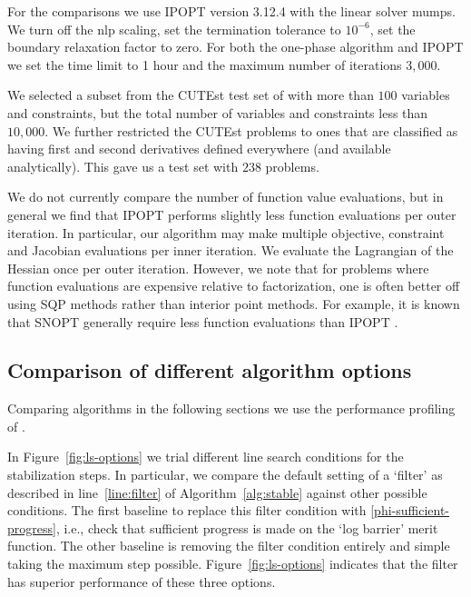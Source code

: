 \documentclass{article}
\begin{document}
For the comparisons we use IPOPT version 3.12.4 with the linear solver mumps. We turn off the nlp scaling, set the termination tolerance to $10^{-6}$, set the boundary relaxation factor to zero. For both the one-phase algorithm and IPOPT we set the time limit to 1 hour and the maximum number of iterations $3,000$.

We selected a subset from the CUTEst test set of with more than $100$ variables and constraints, but the total number of variables and constraints less than $10,000$. We further restricted the CUTEst problems to ones that are classified as having first and second derivatives defined everywhere (and available analytically). This gave us a test set with $238$ problems.

We do not currently compare the number of function value evaluations, but in general we find that IPOPT performs slightly less function evaluations per outer iteration. In particular, our algorithm may make multiple objective, constraint and Jacobian evaluations per inner iteration. We evaluate the Lagrangian of the Hessian once per outer iteration. However, we note that for problems where function evaluations are expensive relative to factorization, one is often better off using SQP methods rather than interior point methods. For example, it is known that SNOPT generally require less function evaluations than IPOPT \cite[Figure 2, Figure 3]{gill2015performance}. 


\subsection{Comparison of different algorithm options}\label{alg:comparison-options}

Comparing algorithms in the following sections we use the performance profiling of \cite{dolan2002benchmarking}.



In Figure~\ref{fig:ls-options} we trial different line search conditions for the stabilization steps. In particular, we compare the default setting of a `filter' as described in line~\ref{line:filter} of Algorithm~\ref{alg:stable} against other possible conditions. The first baseline to replace this filter condition with  \eqref{phi-sufficient-progress}, i.e., check that sufficient progress is made on the `log barrier' merit function. The other baseline is removing the filter condition entirely and simple taking the maximum step possible. Figure~\ref{fig:ls-options} indicates that the filter has superior performance of these three options.
\end{document}
